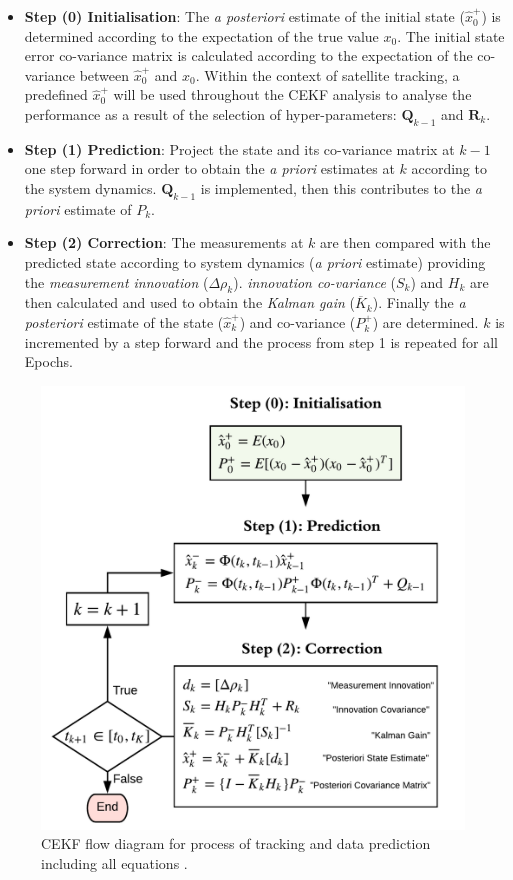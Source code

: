  \begin{itemize}
     \item \textbf{Step (0) Initialisation}: The \textit{a posteriori} estimate of the initial state ($\hat{x}_0^+$) is determined according to the expectation of the true value $x_0$. The initial state error co-variance matrix is calculated according to the expectation of the co-variance between $\hat{x}_0^+$ and $x_0$. Within the context of satellite tracking, a predefined $\hat{x}_0^+$ will be used throughout the CEKF analysis to analyse the performance as a result of the selection of hyper-parameters: $\bm{Q}_{k-1}$ and $\bm{R}_k$.
     \item \textbf{Step (1) Prediction}: Project the state and its co-variance matrix at $k-1$ one step forward in order to obtain the \textit{a priori} estimates at $k$ according to the system dynamics. $\bm{Q}_{k-1}$ is implemented, then this contributes to the \textit{a priori} estimate of $P_k^{}$.
    \item \textbf{Step (2) Correction}: The measurements at $k$ are then compared with the predicted state according to system dynamics (\textit{a priori} estimate) providing the \textit{measurement innovation} ($\Delta{\rho}_k$). \textit{innovation co-variance} ($S_k$) and $H_k$ are then calculated and used to obtain the \textit{Kalman gain} ($\overline{K}_k$). Finally the \textit{a posteriori} estimate of the state ($\hat{x}_k^+$) and co-variance ($P_k^+$) are determined. $k$ is incremented by a step forward and the process from step 1 is repeated for all Epochs.
 \end{itemize}

\begin{figure}[htp]
    \centering
    \includegraphics[width=0.55\linewidth]{graphics/CEKF.png}
    \caption{CEKF flow diagram for process of tracking and data prediction including all equations \cite{3}.}
    \label{fig:CEKF}
\end{figure}


